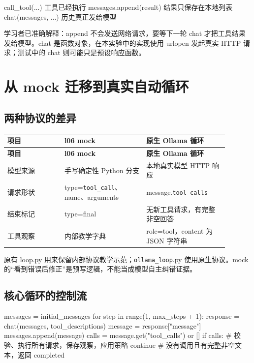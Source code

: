 \begin{Code}
call_tool(...)             工具已经执行
messages.append(result)    结果只保存在本地列表
chat(messages, ...)        历史真正发给模型
\end{Code}

学习者已准确解释：append 不会发送网络请求，要等下一轮 chat 才把工具结果发给模型。chat 是函数对象，在本实验中的实现使用 urlopen 发起真实 HTTP 请求；测试中的 chat 则可能只是预设响应函数。

\section{从 mock 迁移到真实自动循环}

\subsection{两种协议的差异}

{\small\setlength{\tabcolsep}{4pt}
\renewcommand{\arraystretch}{1.25}
\begin{longtable}{>{\raggedright\arraybackslash}p{0.23\linewidth}>{\raggedright\arraybackslash}p{0.33\linewidth}>{\raggedright\arraybackslash}p{0.33\linewidth}}
\toprule
\textbf{项目} & \textbf{l06 mock} & \textbf{原生 Ollama 循环} \\
\midrule\endfirsthead
\toprule
\textbf{项目} & \textbf{l06 mock} & \textbf{原生 Ollama 循环} \\
\midrule\endhead
\bottomrule\endfoot
模型来源 & 手写确定性 Python 分支 & 本地真实模型 HTTP 响应 \\
请求形状 & type=\nolinkurl{tool_call}、name、arguments & message.\nolinkurl{tool_calls} \\
结束标记 & type=final & 无新工具请求，有完整非空回答 \\
工具观察 & 内部教学字典 & role=tool，content 为 JSON 字符串 \\
\end{longtable}}

原有 loop.py 用来保留内部协议教学示范；\nolinkurl{ollama_loop}.py 使用原生协议。mock 的“看到错误后修正”是预写逻辑，不能当成模型自主纠错证据。

\subsection{核心循环的控制流}

\begin{Code}
messages = initial_messages
for step in range(1, max_steps + 1):
    response = chat(messages, tool_descriptions)
    message = response["message"]
    messages.append(message)
    calls = message.get("tool_calls") or []
    if calls:
        # 校验、执行所有请求，保存观察，应用策略
        continue
    # 没有调用且有完整非空文本，返回 completed
\end{Code}

